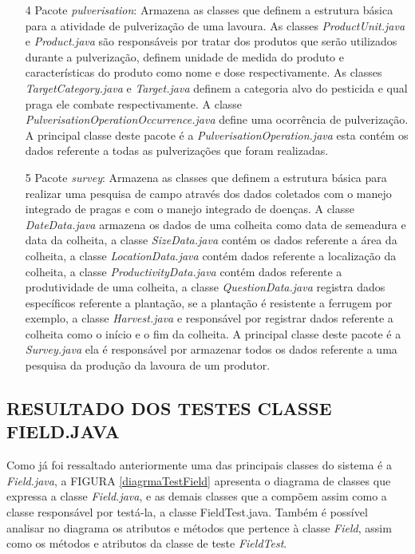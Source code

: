 \begin{itemize}
\item[4]Pacote \textit{pulverisation}: Armazena as classes que definem a estrutura básica para a atividade de pulverização de uma lavoura. As classes \textit{ProductUnit.java} e \textit{Product.java} são responsáveis por tratar dos produtos que serão utilizados durante a pulverização, definem unidade de medida do produto e características do produto como nome e dose respectivamente. As classes \textit{TargetCategory.java} e \textit{Target.java} definem a categoria alvo do pesticida e qual praga ele combate respectivamente. A classe \textit{PulverisationOperationOccurrence.java} define uma ocorrência de pulverização.  A principal classe deste pacote é a \textit{PulverisationOperation.java} esta contém os dados referente a todas as pulverizações que foram realizadas. 

\item[5]Pacote \textit{survey}: Armazena as classes que definem a estrutura básica para realizar uma pesquisa de campo através dos dados coletados com o manejo integrado de pragas e com o manejo integrado de doenças. A classe \textit{DateData.java} armazena os dados de uma colheita como data de semeadura e data da colheita, a classe \textit{SizeData.java} contém os dados referente a área da colheita, a classe \textit{LocationData.java} contém dados referente a localização da colheita, a classe \textit{ProductivityData.java} contém dados referente a produtividade de uma colheita, a classe \textit{QuestionData.java} registra dados específicos referente a plantação, se a plantação é resistente a ferrugem por exemplo, a classe \textit{Harvest.java} e responsável por registrar dados referente a colheita como o início e o fim da colheita. A principal classe deste pacote é a \textit{Survey.java} ela é responsável por armazenar todos os dados referente a uma pesquisa da produção da lavoura de um produtor.

\end{itemize}{}

\subsection{RESULTADO DOS TESTES CLASSE FIELD.JAVA}

Como já foi ressaltado anteriormente uma das principais classes do sistema é a \textit{Field.java}, a FIGURA \ref{diagrmaTestField} apresenta o diagrama de classes que expressa a classe \textit{Field.java}, e as demais classes que a compõem assim como a classe responsável por testá-la, a classe FieldTest.java. Também é possível analisar no diagrama os atributos e métodos que pertence à classe \textit{Field}, assim como os métodos e atributos da classe de teste \textit{FieldTest}.

